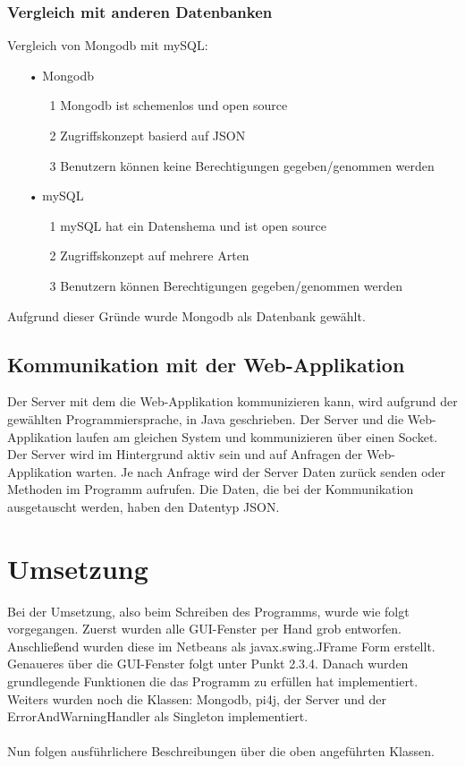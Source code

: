 \subsubsection{Vergleich mit anderen Datenbanken}
Vergleich von Mongodb mit mySQL:
\begin{itemize}
\item[•] Mongodb
\begin{itemize}
\item[1] Mongodb ist schemenlos und open source
\item[2] Zugriffskonzept basierd auf JSON
\item[3] Benutzern können keine Berechtigungen gegeben/genommen werden
\end{itemize}
\item[•] mySQL
\begin{itemize}
\item[1] mySQL hat ein Datenshema und ist open source
\item[2] Zugriffskonzept auf mehrere Arten
\item[3] Benutzern können Berechtigungen gegeben/genommen werden
\end{itemize}
\end{itemize}

Aufgrund dieser Gründe wurde Mongodb als Datenbank gewählt.

\subsection{Kommunikation mit der Web-Applikation}
Der Server mit dem die Web-Applikation kommunizieren kann, wird aufgrund der gewählten Programmiersprache, in Java geschrieben. Der Server und die Web-Applikation laufen am gleichen System und kommunizieren über einen Socket. Der Server wird im Hintergrund aktiv sein und auf Anfragen der Web-Applikation warten. Je nach Anfrage wird der Server Daten zurück senden oder Methoden im Programm aufrufen. Die Daten, die bei der Kommunikation ausgetauscht werden, haben den Datentyp JSON.

\newpage

\section{Umsetzung}
Bei der Umsetzung, also beim Schreiben des Programms, wurde wie folgt vorgegangen. Zuerst wurden alle GUI-Fenster per Hand grob entworfen. Anschließend wurden diese im Netbeans als javax.swing.JFrame Form erstellt. Genaueres über die GUI-Fenster folgt unter Punkt 2.3.4. Danach wurden grundlegende Funktionen die das Programm zu erfüllen hat implementiert. Weiters wurden noch die Klassen: Mongodb, pi4j, der Server und der ErrorAndWarningHandler als Singleton implementiert. 
\\ \\ 
Nun folgen ausführlichere Beschreibungen über die oben angeführten Klassen.

